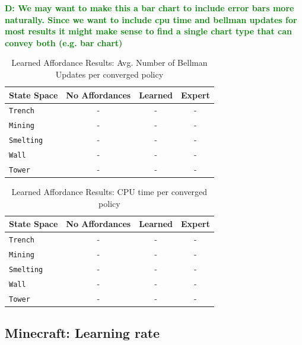 \documentclass[conference]{IEEEtran}
\newcommand{\dnote}[1]{\textcolor{Green}{\textbf{D: #1}}}
\begin{document}
\dnote{We may want to make this a bar chart to include error bars more naturally. Since we want to include cpu time and bellman updates
for most results it might make sense to find a single chart type that can convey both (e.g. bar chart)}
\begin{table}[H]
\centering
\begin{tabular}{ l || c c c }
  State Space & No Affordances & Learned & Expert 	 	\\ \hline
  \texttt{Trench}  	& 	-		&	-	&	 -	\\
  \texttt{Mining}  	& 	-		&	-	&	-  \\
  \texttt{Smelting}  	& 	-		&	-	&	-  \\
  \texttt{Wall}  		& 	-		&	-	&	- \\
  \texttt{Tower}  		& 	-		&	-	&	- \\
\end{tabular}
\caption{Learned Affordance Results: Avg. Number of Bellman Updates per converged policy}
\label{table:minecraft_results_bellman}
\end{table}

\begin{table}[H]
\centering
\begin{tabular}{ l || c c c }
  State Space & No Affordances & Learned & Expert 	 	\\ \hline
  \texttt{Trench}  	& 	-		&	-	&	 -	\\
  \texttt{Mining}  	& 	-		&	-	&	-  \\
  \texttt{Smelting}  	& 	-		&	-	&	-  \\
  \texttt{Wall}  		& 	-		&	-	&	- \\
  \texttt{Tower}  		& 	-		&	-	&	- \\
\end{tabular}
\caption{Learned Affordance Results: CPU time per converged policy}
\label{table:minecraft_results_cpu}
\end{table}

\subsection{Minecraft: Learning rate}
\end{document}
